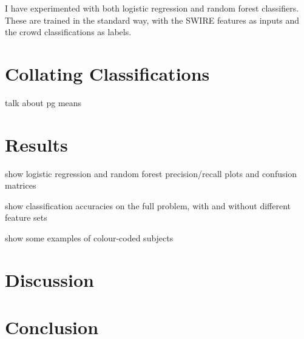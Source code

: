 \documentclass[a4paper]{article}
\begin{document}
    I have experimented with both logistic regression and random forest classifiers. These are trained in the standard way, with the SWIRE features as inputs and the crowd classifications as labels.

  \section{Collating Classifications}
  \label{sec:consensuses}

    talk about pg means

  \section{Results}

    show logistic regression and random forest precision/recall plots and confusion matrices

    show classification accuracies on the full problem, with and without different feature sets

    show some examples of colour-coded subjects

  \section{Discussion}

  \section{Conclusion}

  
  
\end{document}
